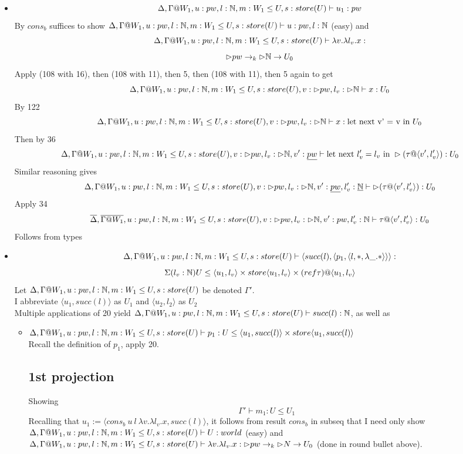 \message{ !name(paper.tex)}\documentclass{article}
\begin{document}
\begin{itemize}
    \item \[\Delta, \Gamma@W_1, u: pw, l: \N, m: W_1 \leq U, s: store(U) \vdash  u_1: pw\]
    By $cons_b$ suffices to show $\Delta, \Gamma@W_1, u: pw, l: \N, m: W_1 \leq U, s: store(U) \vdash u : pw, l : \N$ (easy) and
    \[\Delta, \Gamma@W_1, u: pw, l: \N, m: W_1 \leq U, s: store(U) \vdash \lambda v. \lambda l_v. x:\]  
    \[\rhd pw \rightarrow_k \rhd \mathbb{N} \rightarrow U_0 
    \]
    Apply (108 with 16), then (108 with 11), then 5, then (108 with 11), then 5 again to get
     \[\Delta, \Gamma@W_1, u: pw, l: \N, m: W_1 \leq U, s: store(U), v: \rhd pw, l_v: \rhd \N \vdash x: U_0\]
     By 122
      \[\Delta, \Gamma@W_1, u: pw, l: \N, m: W_1 \leq U, s: store(U), v: \rhd pw, l_v: \rhd \N \vdash x: \text{let next v' = v in $U_0$}\]
      Then by 36 
 \[\Delta, \Gamma@W_1, u: pw, l: \N, m: W_1 \leq U, s: store(U), v: \rhd pw, l_v: \rhd \N, v': \underline{pw} \vdash \text{let next } l_v' = l_v \text{ in } \rhd(\tau @ \langle v', l_v' \rangle): U_0\]
 Similar reasoning gives 
 \[\Delta, \Gamma@W_1, u: pw, l: \N, m: W_1 \leq U, s: store(U), v: \rhd pw, l_v: \rhd \N, v': \underline{pw}, l_v' : \underline{\N} \vdash  \rhd(\tau @ \langle v', l_v' \rangle): U_0\]
   Apply 34
    \[\overline{\Delta}, \overline{\Gamma@W_1}, u: pw, l: \N, m: W_1 \leq U, s: store(U), v: \rhd pw, l_v: \rhd \N, v': pw, l_v' : \N \vdash \tau @ \langle v',  l_v' \rangle: U_0\]
    Follows from types 
    \item \[\Delta, \Gamma@W_1, u: pw, l: \N, m: W_1 \leq U, s: store(U) \vdash  \langle succ(l), \langle p_1, \langle l, *, \lambda \_. *
\rangle \rangle \rangle :\] \[\Sigma(l_v: \mathbb{N}) U \leq \langle u_1, l_v \rangle \times store\langle u_1, l_v \rangle \times (ref \tau)@\langle u_1, l_v \rangle\]
 Let $\Delta, \Gamma@W_1, u: pw, l: \N, m: W_1 \leq U, s: store(U)$ be denoted $\Gamma'$.\\
 I abbreviate $\langle u_1, succ(l) \rangle$ as $U_1$ and $\langle u_2, l_2 \rangle$ as $U_2$\\
Multiple applications of 20 yield $\Delta, \Gamma@W_1, u: pw, l: \N, m: W_1 \leq U, s: store(U) \vdash succ(l) : \N$, as well as
\begin{itemize}
    \item $\Delta, \Gamma@W_1, u: pw, l: \N, m: W_1 \leq U, s: store(U) \vdash p_1 : U \leq \langle u_1, succ(l) \rangle \times store\langle u_1, succ(l) \rangle$\\
    
    Recall the definition of $p_1$, apply 20. 
    \subsection*{1st projection}
    Showing \[\Gamma' \vdash m_1 : U \leq U_1\]
    Recalling that $u_1 := \langle cons_b \: u\:  l\: \lambda v. \lambda l_v. x , succ(l) \rangle$, it follows from result $cons_b$ in subseq that I need only show $\Delta, \Gamma@W_1, u: pw, l: \N, m: W_1 \leq U, s: store(U) \vdash U : world$ (easy) and $\Delta, \Gamma@W_1, u: pw, l: \N, m: W_1 \leq U, s: store(U) \vdash \lambda v. \lambda l_v. x : \rhd pw \imp_k \rhd N \imp U_0$ (done in round bullet above).

\end{itemize}
\end{itemize}
\end{document}
